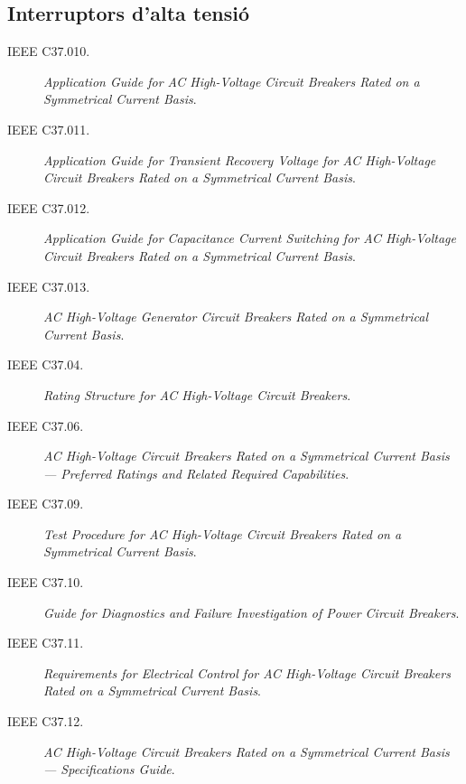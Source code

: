 \subsection*{Interruptors d'alta tensió}
\begin{description}
    \item [\hspace{5mm}IEEE C37.010.] \textit{Application Guide for AC High-Voltage Circuit Breakers Rated on a Symmetrical Current Basis}.
    \item [\hspace{5mm}IEEE C37.011.] \textit{Application Guide for Transient Recovery Voltage for AC High-Voltage Circuit Breakers Rated on a Symmetrical Current Basis}.
    \item [\hspace{5mm}IEEE C37.012.] \textit{Application Guide for Capacitance Current Switching for AC High-Voltage Circuit Breakers Rated on a Symmetrical Current Basis}.
    \item [\hspace{5mm}IEEE C37.013.] \textit{AC High-Voltage Generator Circuit Breakers Rated on a Symmetrical Current Basis}.
    \item [\hspace{5mm}IEEE C37.04.] \textit{Rating Structure for AC High-Voltage Circuit Breakers}.
    \item [\hspace{5mm}IEEE C37.06.] \textit{AC High-Voltage Circuit Breakers Rated on a Symmetrical Current Basis --- Preferred Ratings and Related Required Capabilities}.
    \item [\hspace{5mm}IEEE C37.09.] \textit{Test Procedure for AC High-Voltage Circuit Breakers Rated on a Symmetrical Current Basis}.
    \item [\hspace{5mm}IEEE C37.10.] \textit{Guide for Diagnostics and Failure Investigation of Power Circuit Breakers}.
    \item [\hspace{5mm}IEEE C37.11.] \textit{Requirements for Electrical Control for AC High-Voltage Circuit Breakers Rated on a Symmetrical Current Basis}.
    \item [\hspace{5mm}IEEE C37.12.] \textit{AC High-Voltage Circuit Breakers Rated on a Symmetrical Current Basis --- Specifications Guide}.
\end{description}



